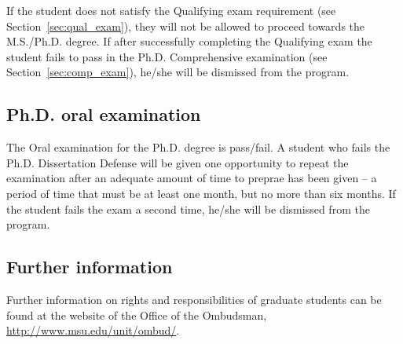If the student does not satisfy the Qualifying exam requirement (see
Section~\ref{sec:qual_exam}), they will not be allowed to proceed
towards the M.S./Ph.D. degree.  If after successfully completing the
Qualifying exam the student fails to pass in the Ph.D. Comprehensive
examination (see Section~\ref{sec:comp_exam}), he/she will be
dismissed from the program.  

\subsection{Ph.D. oral examination}

The Oral examination for the Ph.D. degree is pass/fail.  A student who fails the Ph.D. Dissertation Defense will be given one
opportunity to repeat the examination after an
adequate amount of time to preprae has been given -- a period of time
that must be at least one month, but no more than six months.  If the student fails the exam a second
time, he/she will be dismissed from the program.

\subsection{Further information}

Further information on rights and responsibilities of graduate
students can be found at the website of the Office of the Ombudsman,
\url{http://www.msu.edu/unit/ombud/}.

 

